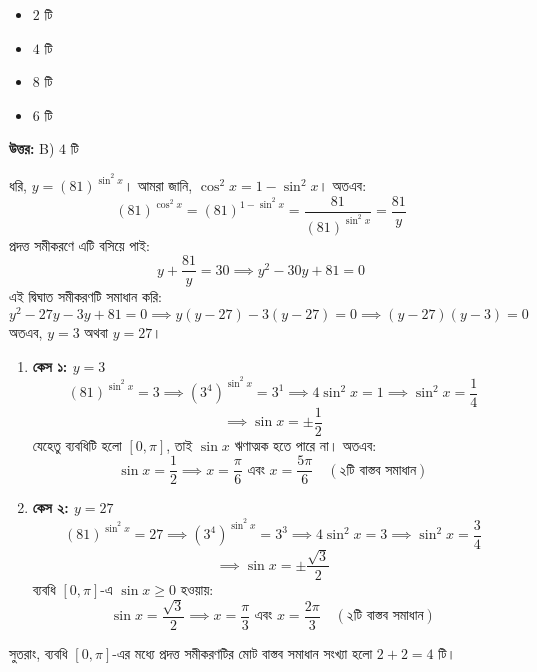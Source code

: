 \documentclass[12pt, a4paper]{article}
\begin{document}
\begin{itemize}[label={}, leftmargin=1cm, itemsep=0.5em]
    \item[\textbf{A)}] $2$ টি
    \item[\textbf{B)}] $4$ টি
    \item[\textbf{C)}] $8$ টি
    \item[\textbf{D)}] $6$ টি
\end{itemize}

\vspace{0.5em}
\begin{tcolorbox}[answerbox]
    \textbf{\color{success} উত্তর:} B) $4$ টি
\end{tcolorbox}
\vspace{1em}

\begin{tcolorbox}[solutionbox={সমাধান (Solution)}]
    \noindent
    ধরি, $y = (81)^{\sin^2 x}$। 
    আমরা জানি, $\cos^2 x = 1 - \sin^2 x$। অতএব:
    \[ (81)^{\cos^2 x} = (81)^{1-\sin^2 x} = \frac{81}{(81)^{\sin^2 x}} = \frac{81}{y} \]
    প্রদত্ত সমীকরণে এটি বসিয়ে পাই:
    \[ y + \frac{81}{y} = 30 \implies y^2 - 30y + 81 = 0 \]
    এই দ্বিঘাত সমীকরণটি সমাধান করি:
    \[ y^2 - 27y - 3y + 81 = 0 \implies y(y-27) - 3(y-27) = 0 \implies (y-27)(y-3) = 0 \]
    অতএব, $y = 3$ অথবা $y = 27$।
    
    \vspace{0.5em}
    \begin{enumerate}[itemsep=0.4em]
        \item \textbf{কেস ১: $y = 3$} \\
        \[ (81)^{\sin^2 x} = 3 \implies (3^4)^{\sin^2 x} = 3^1 \implies 4\sin^2 x = 1 \implies \sin^2 x = \frac{1}{4} \]
        \[ \implies \sin x = \pm \frac{1}{2} \]
        যেহেতু ব্যবধিটি হলো $[0, \pi]$, তাই $\sin x$ ঋণাত্মক হতে পারে না। অতএব:
        \[ \sin x = \frac{1}{2} \implies x = \frac{\pi}{6} \text{ এবং } x = \frac{5\pi}{6} \quad (\text{২টি বাস্তব সমাধান}) \]
        
        \item \textbf{কেস ২: $y = 27$} \\
        \[ (81)^{\sin^2 x} = 27 \implies (3^4)^{\sin^2 x} = 3^3 \implies 4\sin^2 x = 3 \implies \sin^2 x = \frac{3}{4} \]
        \[ \implies \sin x = \pm \frac{\sqrt{3}}{2} \]
        ব্যবধি $[0, \pi]$-এ $\sin x \ge 0$ হওয়ায়:
        \[ \sin x = \frac{\sqrt{3}}{2} \implies x = \frac{\pi}{3} \text{ এবং } x = \frac{2\pi}{3} \quad (\text{২টি বাস্তব সমাধান}) \]
    \end{enumerate}
    
    \vspace{0.5em}
    সুতরাং, ব্যবধি $[0, \pi]$-এর মধ্যে প্রদত্ত সমীকরণটির মোট বাস্তব সমাধান সংখ্যা হলো $2 + 2 = 4$ টি।
\end{tcolorbox}
\end{document}
